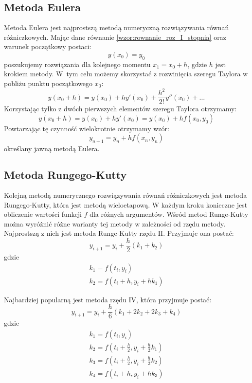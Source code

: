 \subsection*{Metoda Eulera}
Metoda Eulera jest najprostszą metodą numeryczną rozwiązywania równań różniczkowych. Mając dane równanie \ref{wzor:rownanie_roz_I_stopnia} oraz warunek początkowy postaci:
\begin{equation}
	y(x_0) = y_0	
\end{equation}
poszukujemy rozwiązania dla kolejnego momentu $x_1 = x_0 + h$, gdzie $h$ jest krokiem metody. W~tym celu możemy skorzystać z rozwinięcia szeregu Taylora w pobliżu punktu początkowego $x_0$:
\begin{equation}
	y(x_0 + h) = y(x_0) + hy'(x_0) + \frac{h^2}{2!}y''(x_0) + \hdots
\end{equation}
Korzystając tylko z dwóch pierwszych elementów szeregu Taylora otrzymamy:
\begin{equation}
	y(x_0 + h) = y(x_0) + hy'(x_0) = y(x_0) + hf(x_0,y_0)
\end{equation}
Powtarzając tę czynność wielokrotnie otrzymamy wzór:
\begin{equation}
	y_{n+1} = y_{n} + hf(x_n,y_n)
\end{equation}
określany jawną metodą Eulera.

\subsection*{Metoda Rungego-Kutty}
Kolejną metodą numerycznego rozwiązywania równań różniczkowych jest metoda \mbox{Rungego-Kutty}, która jest metodą wieloetapową. W każdym kroku konieczne jest obliczenie wartości funkcji $f$ dla różnych argumentów. Wśród metod Runge-Kutty można wyróżnić różne warianty tej metody w zależności od rzędu metody. Najprostszą z nich jest metoda Runge-Kutty rzędu II. Przyjmuje ona postać:
\begin{equation}
	y_{i+1} = y_i + \frac{h}{2}(k_1 + k_2)
\end{equation}
gdzie
$$\begin{array}{c}
	k_1 = f(t_i,y_i) \\
	k_2 = f(t_i + h, y_i + hk_1)
\end{array}$$

Najbardziej popularną jest metoda rzędu IV, która przyjmuje postać:
\begin{equation}
	y_{i+1} = y_i + \frac{h}{6}(k_1 + 2k_2 + 2k_3 + k_4)
\end{equation}
gdzie
$$\begin{array}{c}
	k_1 = f(t_i,y_i) \\
	k_2 = f(t_i + \frac{h}{2}, y_i + \frac{h}{2}k_1) \\
	k_3 = f(t_i + \frac{h}{2}, y_i + \frac{h}{2}k_2) \\
	k_4 = f(t_i + h,y_i + hk_3) \\
\end{array}$$

